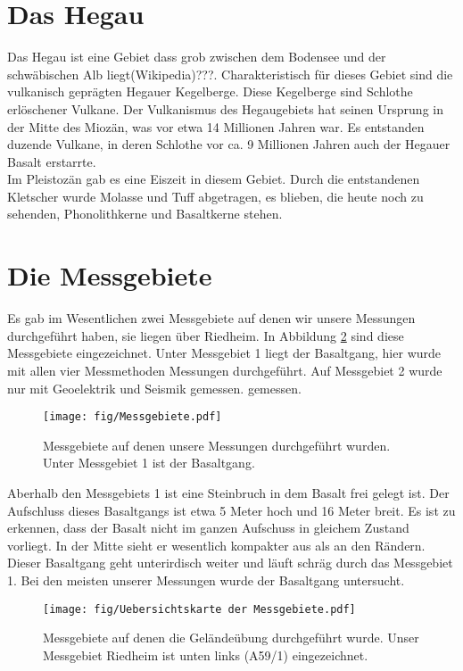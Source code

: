 
\section{Das Hegau}
Das Hegau ist eine Gebiet dass grob zwischen dem Bodensee und der schwäbischen Alb liegt(Wikipedia)???. Charakteristisch für dieses Gebiet sind die vulkanisch 
geprägten Hegauer Kegelberge. Diese Kegelberge sind Schlothe erlöschener Vulkane. Der Vulkanismus des Hegaugebiets hat seinen Ursprung in der Mitte des Miozän, 
was vor etwa 14 Millionen Jahren war. Es entstanden duzende Vulkane, in deren Schlothe vor ca. 9 Millionen Jahren auch der Hegauer Basalt erstarrte.\\
Im Pleistozän gab es eine Eiszeit in diesem Gebiet. Durch die entstandenen Kletscher wurde Molasse und Tuff abgetragen, es blieben, die heute noch zu sehenden, 
Phonolithkerne und Basaltkerne stehen. 






\section{Die Messgebiete}


Es gab im Wesentlichen zwei Messgebiete auf denen wir unsere Messungen durchgeführt haben, sie liegen über Riedheim. In Abbildung \ref{abb:Messgebiete} sind diese Messgebiete 
eingezeichnet. Unter Messgebiet 1 liegt der Basaltgang, hier wurde mit allen vier Messmethoden Messungen durchgeführt. 
Auf Messgebiet 2 wurde nur mit Geoelektrik und Seismik gemessen.
gemessen.
\begin{figure}
 \centering
 \texttt{[image: fig/Messgebiete.pdf]}
 \caption[Messgebiete]{Messgebiete auf denen unsere Messungen durchgeführt wurden. Unter Messgebiet 1 ist der Basaltgang.}
 \label{abb:Messgebiete}
\end{figure}

Aberhalb den Messgebiets 1 ist eine Steinbruch in dem Basalt frei gelegt ist. Der Aufschluss dieses Basaltgangs ist etwa 5 Meter hoch und 16 Meter breit. 
Es ist zu erkennen, dass der Basalt nicht im ganzen Aufschuss in gleichem Zustand vorliegt. In der Mitte sieht er wesentlich kompakter aus als an den Rändern.
Dieser Basaltgang geht unterirdisch weiter und läuft schräg durch das Messgebiet 1. Bei den meisten unserer Messungen wurde der Basaltgang untersucht.

\begin{figure}
 \centering
 \texttt{[image: fig/Uebersichtskarte der Messgebiete.pdf]}
 \caption[Messgebiete]{Messgebiete auf denen die Geländeübung durchgeführt wurde. Unser Messgebiet Riedheim ist unten links (A59/1) eingezeichnet.}
 \label{abb:Messgebiete}
\end{figure}

